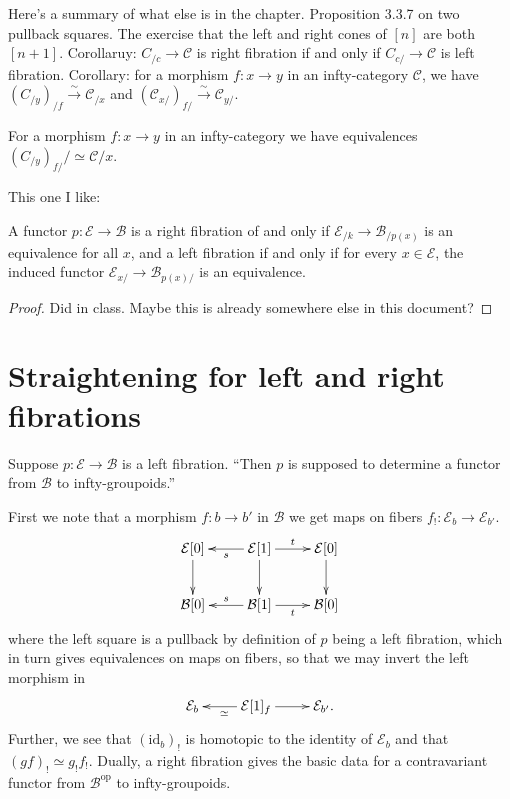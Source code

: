 \medskip\noindent
Here's a summary of what else is in the
chapter.
Proposition 3.3.7 on two pullback squares.
The exercise that the left and right cones of
$[n]$ are both $[n+1]$.
Corollaruy: $C_{/c}\to \mathcal{C}$ is right
fibration
if and only if $C_{c/}\to \mathcal{C}$ is
left fibration.
Corollary: for a morphism  $f:x \to y$ in an
infty-category $\mathcal{C}$,
we have
$(C_{/y})_{/f}\xrightarrow{\sim}\mathcal{C}
_{/x}$
and
$(\mathcal{C}_{x/})_{f/}\xrightarrow{\sim}
\mathcal{C}_{y/}$.

\begin{lemma}
\label{lemma-3.3.9}
For a morphism $f:x \to y$ in an
infty-category
we have equivalences $(C_{/y})_{f/}/\simeq
\mathcal{C}{/x} $.
\end{lemma}


\medskip\noindent
This one I like:

\begin{lemma}
\label{lemma-left-fibration-iff-induced}
A functor $p:\mathcal{E} \to \mathcal{B}$ is
a
right fibration of and only if
$\mathcal{E}_{/k}\to\mathcal{B}_{/p(x)}$
is an equivalence for all $x$, and a
left fibration
if and only if for every $x \in \mathcal{E}$,
the induced functor $\mathcal{E}_{x/}\to
\mathcal{B}_{p(x)/}$
is an equivalence.
\end{lemma}

\begin{proof}
Did in class. Maybe this is already somewhere
else in this document?
\end{proof}






\section{Straightening for left and right
fibrations}
\label{section-straightening}

\noindent
Suppose $p:\mathcal{E} \to \mathcal{B}$ is a
left fibration.
``Then $p$ is supposed to determine a functor
from $\mathcal{B}\text{}$ to
infty-groupoids.''

First we note that a morphism $f:b \to b'$ in
$\mathcal{B}$
we get maps on fibers $f_!:\mathcal{E}_b \to
\mathcal{E}_{b'}$.
$$
\xymatrix{
\mathcal{E}[0]\ar[d]&\mathcal{E}[1]\ar[l]
^s\ar[d]\ar[r]^t&
\mathcal{E}[0]\ar[d]\\
\mathcal{B}[0]&\mathcal{B}[1]\ar[l]_s\ar[r]
_t&\mathcal{B}[0]
}
$$
where the left square is a pullback by
definition of
$p$ being a left fibration, which in turn
gives
equivalences on maps on fibers, so that we
may invert the
left morphism in
$$
\xymatrix{
\mathcal{E}_b & \mathcal{E}[1]_f\ar[l]^\simeq
\ar[r]& \mathcal{E}_{b'}.
}
$$
Further, we see that $(\text{id}_b)_!$ is
homotopic to the identity of $\mathcal{E}_b$
and that $(gf)_! \simeq g_!f_!$.
Dually, a right fibration gives the
basic data for a contravariant functor from
$\mathcal{B}^{\text{op}}$ to
infty-groupoids.

